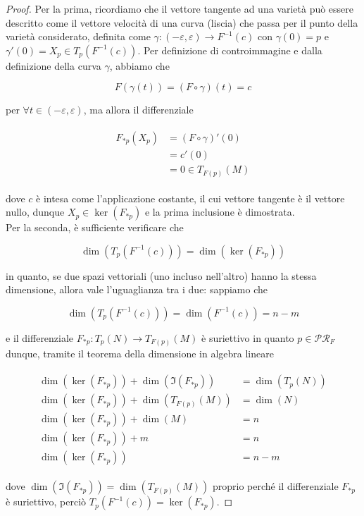\begin{proof}
	Per la prima, ricordiamo che il vettore tangente ad una varietà può essere descritto come il vettore velocità di una curva (liscia) che passa per il punto della varietà considerato, definita come $ \gamma : (-\varepsilon,\varepsilon) \to F^{-1}(c) $ con $ \gamma(0) = p $ e $ \gamma'(0) = X_{p} \in T_{p}(F^{-1}(c)) $. Per definizione di controimmagine e dalla definizione della curva $ \gamma $, abbiamo che
	
	\begin{equation}
		F(\gamma(t)) = (F \circ \gamma)(t) = c
	\end{equation}
	
	per $ \forall t \in (-\varepsilon,\varepsilon) $, ma allora il differenziale
	
	\begin{align}
		\begin{split}
			F_{*p}(X_{p}) &= (F \circ \gamma)'(0)\\
			&= c'(0)\\
			&= 0 \in T_{F(p)}(M)
		\end{split}
	\end{align}

	dove $ c $ è intesa come l'applicazione costante, il cui vettore tangente è il vettore nullo, dunque $ X_{p} \in \ker(F_{*p}) $ e la prima inclusione è dimostrata.\\
	Per la seconda, è sufficiente verificare che
	
	\begin{equation}
		\dim(T_{p}(F^{-1}(c))) = \dim(\ker(F_{*p}))
	\end{equation}

	in quanto, se due spazi vettoriali (uno incluso nell'altro) hanno la stessa dimensione, allora vale l'uguaglianza tra i due: sappiamo che
	
	\begin{equation}
		\dim(T_{p}(F^{-1}(c))) = \dim(F^{-1}(c)) = n-m
	\end{equation}

	e il differenziale $ F_{*p} : T_{p}(N) \to T_{F(p)}(M) $ è suriettivo in quanto $ p \in \mathcal{PR}_{F} $ dunque, tramite il teorema della dimensione in algebra lineare
	
	\begin{align}
		\begin{split}
			\dim(\ker(F_{*p})) + \dim(\Im(F_{*p})) &= \dim(T_{p}(N))\\
			\dim(\ker(F_{*p})) + \dim(T_{F(p)}(M)) &= \dim(N)\\
			\dim(\ker(F_{*p})) + \dim(M) &= n\\
			\dim(\ker(F_{*p})) + m &= n\\
			\dim(\ker(F_{*p})) &= n-m
		\end{split}		
	\end{align}

	dove $ \dim(\Im(F_{*p})) = \dim(T_{F(p)}(M)) $ proprio perché il differenziale $ F_{*p} $ è suriettivo, perciò $ T_{p}(F^{-1}(c)) = \ker(F_{*p}) $.
\end{proof}

